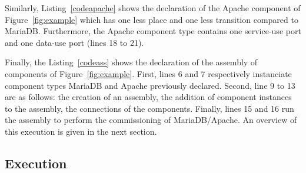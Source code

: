 Similarly, Listing~\ref{codeapache} shows the declaration of the
Apache component of Figure~\ref{fig:example} which has one less place
and one less transition compared to MariaDB. Furthermore, the Apache
component type contains one service-use port and one data-use port
(lines 18 to 21).



Finally, the Listing~\ref{codeass} shows the declaration of the
assembly of components of Figure~\ref{fig:example}. First, lines 6 and
7 respectively instanciate component types MariaDB and Apache
previously declared. Second, line 9 to 13 are as follows: the creation
of an assembly, the addition of component instances to the assembly,
the connections of the components. Finally, lines 15 and 16 run the
assembly to perform the commissioning of MariaDB/Apache. An overview
of this execution is given in the next section.



\subsection{Execution}


